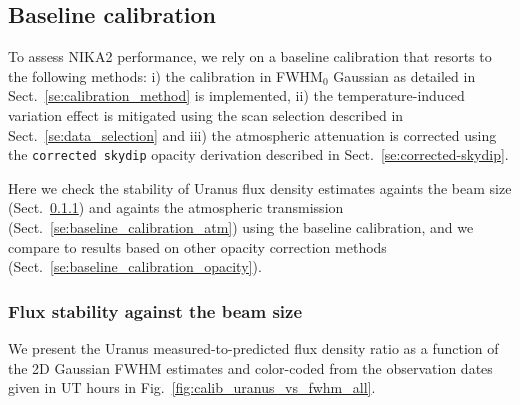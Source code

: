 

\subsection{Baseline calibration}
\label{se:baseline_calibration}

To assess NIKA2 performance, we rely on a baseline calibration that
resorts to the following methods: i) the calibration in FWHM$_0$ Gaussian
as detailed in Sect.~\ref{se:calibration_method} is implemented, ii)
the temperature-induced variation effect is mitigated using the scan
selection described in Sect.~\ref{se:data_selection} and iii) the
atmospheric attenuation is corrected using the {\tt corrected skydip}
opacity derivation described in Sect.~\ref{se:corrected-skydip}.

Here we check the stability of Uranus flux density
estimates againts the beam size
(Sect.~\ref{se:baseline_calibration_scans}) and againts the
atmospheric transmission (Sect.~\ref{se:baseline_calibration_atm})
using the baseline calibration, 
and we compare to results based on other opacity correction methods
(Sect.~\ref{se:baseline_calibration_opacity}).


\subsubsection{Flux stability against the beam size}
\label{se:baseline_calibration_scans}
We present the Uranus measured-to-predicted flux density ratio as a
function of the 2D Gaussian FWHM estimates and color-coded from the
observation dates given in UT hours in
Fig.~\ref{fig:calib_uranus_vs_fwhm_all}.


